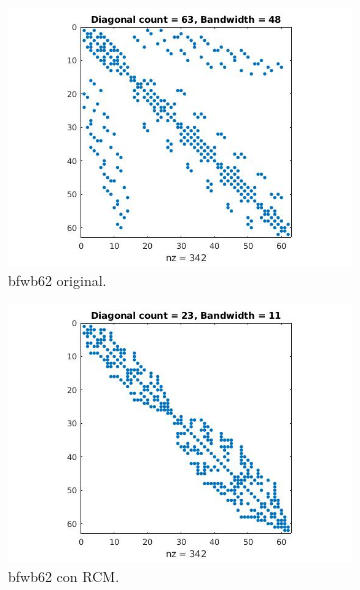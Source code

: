 \begin{figure}
\centering
\begin{subfigure}[t]{.3\textwidth}
  \centering
  \includegraphics[width=\linewidth]{imagenes/chap4/bfwb62_spy.jpg}
  \caption{bfwb62 original.}
  \label{fig:bfwb62_spy-diag}
\end{subfigure}%
\begin{subfigure}[t]{.3\textwidth}
  \centering
  \includegraphics[width=\linewidth]{imagenes/chap4/bfwb62_rcm_spy.jpg}
  \caption{bfwb62 con RCM.}
  \label{fig:bfwb62_rcm_spy-diag}
\end{subfigure}
\begin{subfigure}[t]{.3\textwidth}
  \centering

\end{subfigure}
\end{figure}
